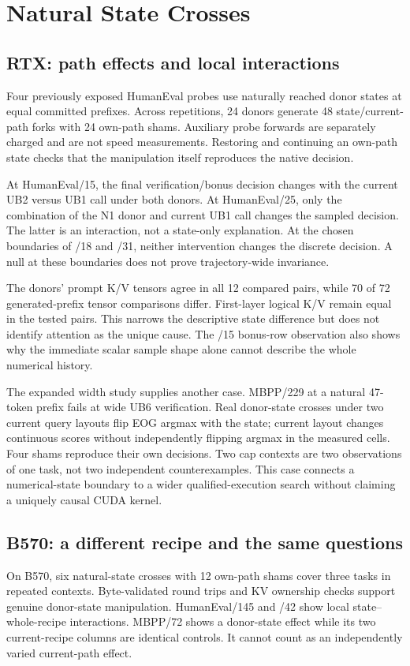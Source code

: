 \documentclass{article}
\begin{document}
\section{Natural State Crosses}
\label{sec:cross}
\subsection{RTX: path effects and local interactions}
Four previously exposed HumanEval probes use naturally reached donor states at equal committed prefixes. Across repetitions, 24 donors generate 48 state/current-path forks with 24 own-path shams. Auxiliary probe forwards are separately charged and are not speed measurements. Restoring and continuing an own-path state checks that the manipulation itself reproduces the native decision.

At HumanEval/15, the final verification/bonus decision changes with the current UB2 versus UB1 call under both donors. At HumanEval/25, only the combination of the N1 donor and current UB1 call changes the sampled decision. The latter is an interaction, not a state-only explanation. At the chosen boundaries of /18 and /31, neither intervention changes the discrete decision. A null at these boundaries does not prove trajectory-wide invariance.

The donors' prompt K/V tensors agree in all 12 compared pairs, while 70 of 72 generated-prefix tensor comparisons differ. First-layer logical K/V remain equal in the tested pairs. This narrows the descriptive state difference but does not identify attention as the unique cause. The /15 bonus-row observation also shows why the immediate scalar sample shape alone cannot describe the whole numerical history.

The expanded width study supplies another case. MBPP/229 at a natural 47-token prefix fails at wide UB6 verification. Real donor-state crosses under two current query layouts flip EOG argmax with the state; current layout changes continuous scores without independently flipping argmax in the measured cells. Four shams reproduce their own decisions. Two cap contexts are two observations of one task, not two independent counterexamples. This case connects a numerical-state boundary to a wider qualified-execution search without claiming a uniquely causal CUDA kernel.

\subsection{B570: a different recipe and the same questions}
On B570, six natural-state crosses with 12 own-path shams cover three tasks in repeated contexts. Byte-validated round trips and KV ownership checks support genuine donor-state manipulation. HumanEval/145 and /42 show local state--whole-recipe interactions. MBPP/72 shows a donor-state effect while its two current-recipe columns are identical controls. It cannot count as an independently varied current-path effect.
\end{document}
